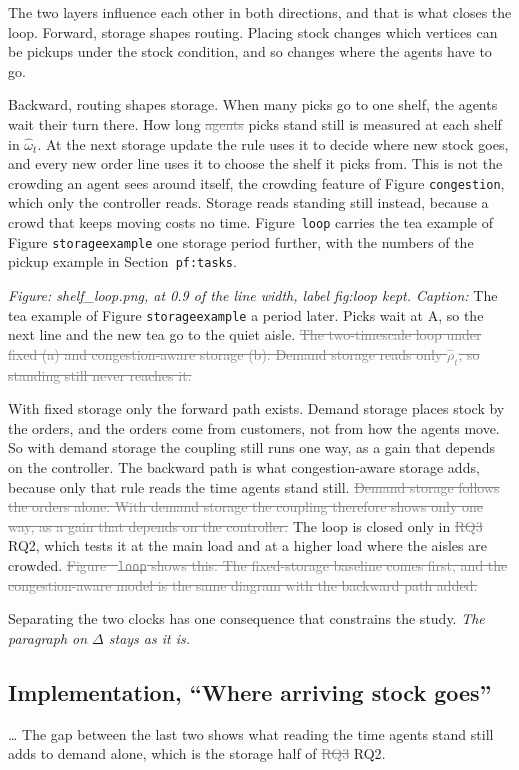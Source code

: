 \documentclass[11pt,a4paper]{article}
\newcommand{\new}[1]{\textcolor{newc}{#1}}
\newcommand{\old}[1]{\textcolor{gray}{\sout{#1}}}
\newcommand{\mockup}[1]{\textit{#1}}
\begin{document}
The two layers influence each other in both directions, and that is what
closes the loop. Forward, storage shapes routing. Placing stock changes
which vertices can be pickups under the stock condition, and so changes where
the agents have to go.

Backward, routing shapes storage. \new{When many picks go to one shelf, the
agents wait their turn there.} How long \old{agents} \new{picks} stand still
is measured at each shelf in $\hat\omega_t$. At the next storage update the
rule uses it to decide where new stock goes, and every new order line uses it
to choose the shelf it picks from. \new{This is not the crowding an agent sees
around itself, the crowding feature of Figure \texttt{congestion}, which only the
controller reads. Storage reads standing still instead, because a crowd that
keeps moving costs no time.
Figure~\texttt{loop} carries the tea example of Figure \texttt{storageexample}
one storage period further, with the numbers of the pickup example in
Section~\texttt{pf:tasks}.}

\mockup{Figure: shelf\_loop.png, at 0.9 of the line width, label fig:loop kept.
Caption:} \new{The tea example of Figure \texttt{storageexample} a period later.
Picks wait at A, so the next line and the new tea go to the quiet aisle.}
\old{The two-timescale loop under fixed (a) and congestion-aware storage (b).
Demand storage reads only $\hat\rho_t$, so standing still never reaches it.}

With fixed storage only the forward path exists. \new{Demand storage places
stock by the orders, and the orders come from customers, not from how the
agents move. So with demand storage the coupling still runs one way, as a gain
that depends on the controller.} The backward path is what congestion-aware
storage adds, because only that rule reads the time agents stand still.
\old{Demand storage follows the orders alone. With demand storage the coupling
therefore shows only one way, as a gain that depends on the controller.} The
loop is closed only in \old{RQ3} \new{RQ2}, which tests it at the main load and
at a higher load where the aisles are crowded. \old{Figure~
\texttt{loop}
  shows this. The fixed-storage baseline comes first, and the congestion-aware
model is the same diagram with the backward path added.}

Separating the two clocks has one consequence that constrains the study.
\mockup{The paragraph on $\Delta$ stays as it is.}

\subsection*{Implementation, ``Where arriving stock goes''}
\ldots{} The gap between the last two shows what reading the time agents stand
still adds to demand alone, which is the storage half of \old{RQ3} \new{RQ2}.
\end{document}
